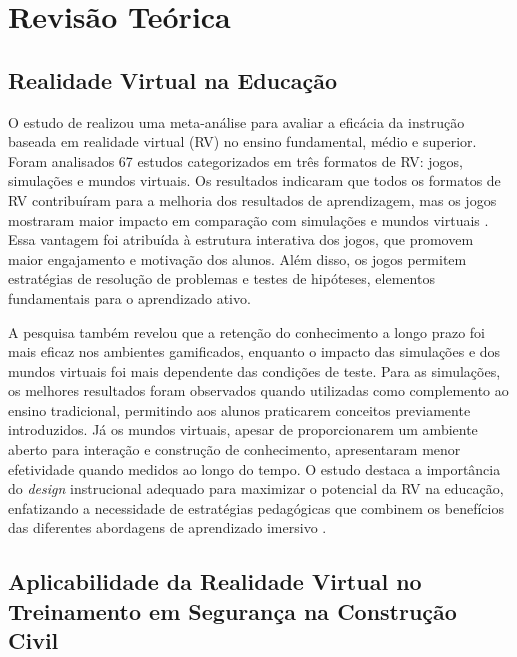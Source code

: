 \chapter{Revisão Teórica}
\label{cap:revisao}

\section{Realidade Virtual na Educação}

O estudo de  realizou uma meta-análise para avaliar a eficácia da instrução baseada em realidade virtual (RV) no ensino fundamental, médio e superior. Foram analisados 67 estudos categorizados em três formatos de RV: jogos, simulações e mundos virtuais. Os resultados indicaram que todos os formatos de RV contribuíram para a melhoria dos resultados de aprendizagem, mas os jogos mostraram maior impacto em comparação com simulações e mundos virtuais \cite[p.~30]{merchant2014}. Essa vantagem foi atribuída à estrutura interativa dos jogos, que promovem maior engajamento e motivação dos alunos. Além disso, os jogos permitem estratégias de resolução de problemas e testes de hipóteses, elementos fundamentais para o aprendizado ativo.

A pesquisa também revelou que a retenção do conhecimento a longo prazo foi mais eficaz nos ambientes gamificados, enquanto o impacto das simulações e dos mundos virtuais foi mais dependente das condições de teste. Para as simulações, os melhores resultados foram observados quando utilizadas como complemento ao ensino tradicional, permitindo aos alunos praticarem conceitos previamente introduzidos. Já os mundos virtuais, apesar de proporcionarem um ambiente aberto para interação e construção de conhecimento, apresentaram menor efetividade quando medidos ao longo do tempo. O estudo destaca a importância do \textit{design} instrucional adequado para maximizar o potencial da RV na educação, enfatizando a necessidade de estratégias pedagógicas que combinem os benefícios das diferentes abordagens de aprendizado imersivo \cite[p.~37]{merchant2014}.

\section{Aplicabilidade da Realidade Virtual no Treinamento em Segurança na Construção Civil}

